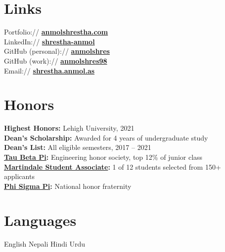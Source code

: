 \documentclass[]{deedy-resume-openfont}
\begin{document}
\newpage

%
%

\begin{minipage}[t]{0.33\textwidth}


\section{Links}
Portfolio://  \href{https://www.anmolshrestha.com/}{\bf anmolshrestha.com} \\
LinkedIn://  \href{https://www.linkedin.com/in/shrestha-anmol}{\bf shrestha-anmol} \\
GitHub (personal):// \href{https://github.com/anmolshres}{\bf anmolshres} \\
GitHub (work):// \href{https://github.com/anmolshres98}{\bf anmolshres98} \\
Email://  \href{mailto:shrestha.anmol.as@gmail.com}{\bf shrestha.anmol.as}
\sectionsep


\section{Honors}
{\bf Highest Honors:} Lehigh University, 2021 \\
{\bf Dean's Scholarship:} Awarded for 4 years of undergraduate study \\
{\bf Dean's List:} All eligible semesters, 2017 – 2021 \\
{\bf \href{https://www.tbp.org/home.cfm}{Tau Beta Pi}:} Engineering honor society, top 12\% of junior class \\
{\bf \href{https://business.lehigh.edu/centers/martindale-center/programs/martindale-student-associates-honors-program}{Martindale Student Associate}:} 1 of 12 students selected from 150+ applicants \\
{\bf \href{https://phisigmapi.org/}{Phi Sigma Pi}:} National honor fraternity
\sectionsep


\section{Languages}
English \textbullet{} Nepali \textbullet{} Hindi \textbullet{} Urdu
\sectionsep

\end{minipage}
\end{document}
